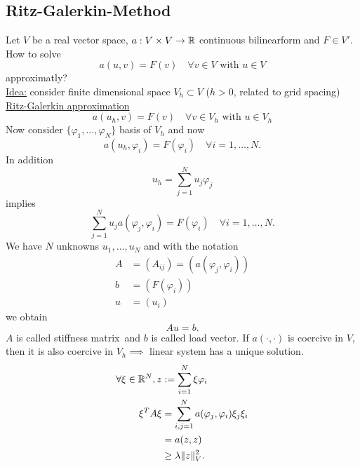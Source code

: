 \subsection{Ritz-Galerkin-Method}
Let $V$ be a real vector space, $a:V\times V \to \mathbb{R} $ continuous bilinearform and $F \in V'$. How to solve
\begin{equation*}
	a(u,v) = F(v) \quad \forall v \in V \text{ with }u \in V
\end{equation*}
approximatly?\\
\underline{Idea:} consider finite dimensional space $V_h \subset V$ ($h > 0$, related to grid spacing)\\
\underline{Ritz-Galerkin approximation}
\begin{equation*}
	a(u_h,v) = F(v) \quad \forall v \in V_h \text{ with }u \in V_h
\end{equation*}
Now consider $\{ \varphi_1,\dots,\varphi_N\}$ basis of $V_h$ and now
\begin{equation*}
	a(u_h,\varphi_i) = F(\varphi_i) \quad \forall i = 1, \dots,N.
\end{equation*}
In addition 
\begin{equation*}
	u_h = \displaystyle \sum^N_{j=1} u_j\varphi_j
\end{equation*}
implies
\begin{equation*}
	\displaystyle \sum^N_{j=1} u_ja(\varphi_j, \varphi_i) = F(\varphi_i) \quad \forall i = 1, \dots,N.
\end{equation*}
We have $N$ unknowns $u_1,\dots,u_N$ and with the notation
\begin{align*}
	A &= (A_{ij}) = (a(\varphi_j, \varphi_i))\\
	b &= (F(\varphi_i))\\
	u &=(u_i)
\end{align*}
we obtain
\begin{equation*}
	Au =b.
\end{equation*}
$A$ is called \glqq stiffness matrix\grqq\ and $b$ is called \glqq load vector\grqq.
If $a(\cdot,\cdot)$ is coercive in $V$, then it is also coercive in $V_h \implies$ linear system has a unique solution. 
\begin{align*}
	\forall \xi \in \mathbb{R}^N, z &:= \displaystyle \sum^N_{i=1} \xi\varphi_i\\
	\xi^TA\xi &= \displaystyle \sum^N_{i,j=1}a(\varphi_j,\varphi_i)\xi_j\xi_i\\
	&=a(z,z)\\
	& \geq \lambda \|z\|^2_V.
\end{align*}
